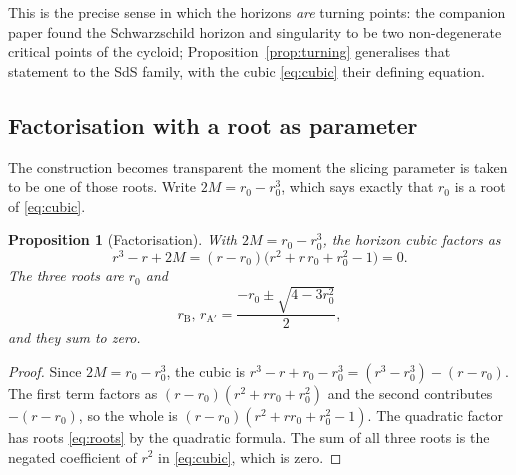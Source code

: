\documentclass[11pt,a4paper]{article}
\newtheorem{proposition}[theorem]{Proposition}
\theoremstyle{definition}
\begin{document}
This is the precise sense in which the horizons \emph{are} turning points: the companion paper found the Schwarzschild horizon and singularity to be two non-degenerate critical points of the cycloid; Proposition~\ref{prop:turning} generalises that statement to the SdS family, with the cubic \eqref{eq:cubic} their defining equation.

\subsection{Factorisation with a root as parameter}

The construction becomes transparent the moment the slicing parameter is taken to be one of those roots. Write $2M=r_{0}-r_{0}^{3}$, which says exactly that $r_{0}$ is a root of \eqref{eq:cubic}.

\begin{proposition}[Factorisation]\label{prop:factor}
With $2M=r_{0}-r_{0}^{3}$, the horizon cubic factors as
\begin{equation}\label{eq:factored}
  r^{3}-r+2M=(r-r_{0})\bigl(r^{2}+r\,r_{0}+r_{0}^{2}-1\bigr)=0 .
\end{equation}
The three roots are $r_{0}$ and
\begin{equation}\label{eq:roots}
  r_{\mathrm{B}},\,r_{\mathrm{A}'}
  =\frac{-r_{0}\pm\sqrt{4-3r_{0}^{2}}}{2},
\end{equation}
and they sum to zero.
\end{proposition}

\begin{proof}
Since $2M=r_{0}-r_{0}^{3}$, the cubic is $r^{3}-r+r_{0}-r_{0}^{3}=(r^{3}-r_{0}^{3})-(r-r_{0})$. The first term factors as $(r-r_{0})(r^{2}+r r_{0}+r_{0}^{2})$ and the second contributes $-(r-r_{0})$, so the whole is $(r-r_{0})(r^{2}+r r_{0}+r_{0}^{2}-1)$. The quadratic factor has roots \eqref{eq:roots} by the quadratic formula. The sum of all three roots is the negated coefficient of $r^{2}$ in \eqref{eq:cubic}, which is zero.
\end{proof}
\end{document}
